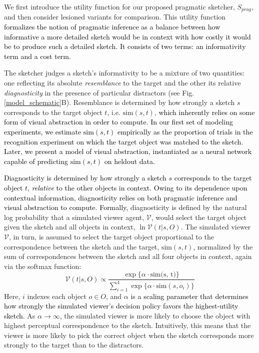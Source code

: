 \documentclass{svjour3}
\newcommand{\revised}[1]{\textcolor{Black}{#1}}
\begin{document}
We first introduce the utility function for our proposed pragmatic sketcher, $S_{prag}$, and then consider lesioned variants for comparison. 
This utility function \revised{formalizes the notion of pragmatic inference as a balance between how informative a more detailed sketch would be in context with how costly it would be to produce such a detailed sketch. It consists of two terms: an informativity term and a cost term.}

The sketcher judges a sketch's informativity to be a mixture of two quantities: one reflecting its absolute \textit{resemblance} to the target and the other its relative \textit{diagnosticity} in the presence of particular distractors (see Fig. \ref{model_schematic}B). 
Resemblance is determined by how strongly a sketch $s$ corresponds to the target object $t$, i.e. $\textrm{sim}(s,t)$, \revised{which inherently relies on some form of visual abstraction in order to compute.}
\revised{In our first set of modeling experiments, we estimate $\textrm{sim}(s,t)$ empirically as the proportion of trials in the recognition experiment on which the target object was matched to the sketch. Later, we present a model of visual abstraction, instantiated as a neural network capable of predicting $\textrm{sim}(s,t)$ on heldout data.}

\revised{Diagnosticity is determined by how strongly a sketch $s$ corresponds to the target object $t$, \textit{relative} to the other objects in context. Owing to its dependence upon contextual information, diagnosticity relies on both pragmatic inference and visual abstraction to compute.}
\revised{Formally,} diagnosticity is defined by the natural log probability that a simulated viewer agent, $\mathcal{V}$, would select the target object given the sketch and all objects in context, $\ln \mathcal{V}(t|s,O)$. 
The simulated viewer $\mathcal{V}$, in turn, is assumed to select the target object proportional to the correspondence between the sketch and the target, $\textrm{sim}(s,t)$, normalized by the sum of correspondences between the sketch and all four objects in context, again via the softmax function:
\begin{equation} \label{literal_viewer_score}
\mathcal{V}(t|s,O) \propto \frac {\exp\{\alpha \cdot \textrm{sim(s, t)}\}} {\sum_{i=1}^{4} \exp\{\alpha \cdot \textrm{sim}(s,o_i)\}}
\end{equation}
Here, $i$ indexes each object $o\in O$, and $\alpha$ is \revised{a scaling parameter that determines how strongly the simulated viewer's decision policy favors the highest-utility sketch.}
As $\alpha \rightarrow \infty$, the simulated viewer is more likely to choose the object with highest perceptual correspondence to the sketch. 
Intuitively, this means that the viewer is more likely to pick the correct object when the sketch corresponds more strongly to the target than to the distractors.
\end{document}
